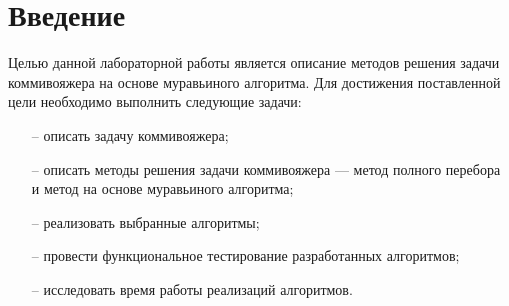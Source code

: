 \chapter*{Введение}

Целью данной лабораторной работы является описание методов решения задачи коммивояжера на основе муравьиного алгоритма. Для достижения поставленной цели необходимо выполнить следующие задачи:
\begin{itemize}
	\item[--] описать задачу коммивояжера;
	\item[--] описать методы решения задачи коммивояжера --- метод полного перебора и метод на основе муравьиного алгоритма;
	\item[--] реализовать выбранные алгоритмы;
	\item[--] провести функциональное тестирование разработанных алгоритмов;
	\item[--] исследовать время работы реализаций алгоритмов.  
\end{itemize}
